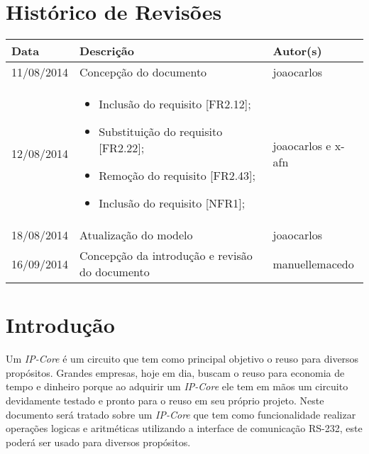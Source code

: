 \documentclass{article}
\begin{document}
\capa

\newpage

\section*{\center Histórico de Revisões}
  \vspace*{1cm}
  \begin{table}[ht]
    \centering
    \begin{tabular}[pos]{|m{2cm} | m{7.2cm} | m{3.8cm}|} 
      \hline
      \cellcolor[gray]{0.9}
      \textbf{Data} & \cellcolor[gray]{0.9}\textbf{Descrição} & \cellcolor[gray]{0.9}\textbf{Autor(s)}\\ \hline
      \hline
      \small 11/08/2014 & \small Concepção do documento & \small joaocarlos \\ \hline      
      \small 12/08/2014 &
      \begin{small}
        \begin{itemize}
          \item Inclusão do requisito [FR2.12];
          \item Substituição do requisito [FR2.22];
          \item Remoção do requisito [FR2.43];
          \item Inclusão do requisito [NFR1];
        \end{itemize}
      \end{small} & \small joaocarlos e x-afn \\ \hline 
      \small 18/08/2014 & \small Atualização do modelo & \small joaocarlos \\ \hline       
	  \small 16/09/2014 & \small Concepção da introdução e revisão do documento & \small manuellemacedo \\ \hline    
    \end{tabular}
  \end{table}

\newpage

\tableofcontents
\newpage

\section{Introdução}
Um \textit{IP-Core} é um circuito que tem como principal objetivo o reuso para diversos propósitos. Grandes empresas, hoje em dia, buscam o reuso para economia de tempo e dinheiro porque ao adquirir um \textit{IP-Core} ele tem em mãos um circuito devidamente testado e pronto para o reuso em seu próprio projeto.  Neste documento será tratado sobre um \textit{IP-Core} que tem como funcionalidade realizar operações logicas e aritméticas utilizando a interface de comunicação RS-232, este poderá ser usado para diversos propósitos.    
\end{document}
